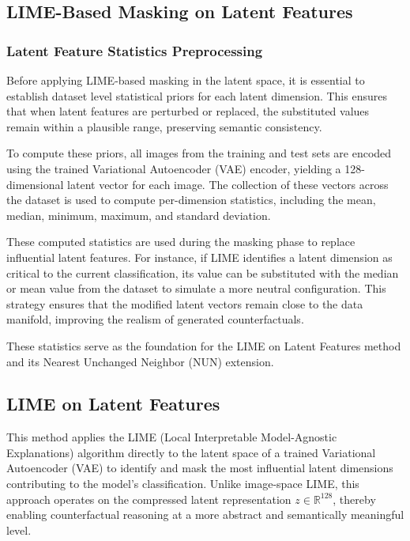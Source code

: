 \vspace{1em}
\subsection{LIME-Based Masking on Latent Features} \label{sec:lime_based_masking_on_latent_features}

\subsubsection*{Latent Feature Statistics Preprocessing}
\label{sec:latent_statistics_preprocessing}
Before applying LIME-based masking in the latent space, it is essential to establish dataset level statistical priors for each latent dimension. This ensures that when latent features are perturbed or replaced, the substituted values remain within a plausible range, preserving semantic consistency.

To compute these priors, all images from the training and test sets are encoded using the trained Variational Autoencoder (VAE) encoder, yielding a 128-dimensional latent vector for each image. The collection of these vectors across the dataset is used to compute per-dimension statistics, including the mean, median, minimum, maximum, and standard deviation.

These computed statistics are used during the masking phase to replace influential latent features. For instance, if LIME identifies a latent dimension as critical to the current classification, its value can be substituted with the median or mean value from the dataset to simulate a more neutral configuration. This strategy ensures that the modified latent vectors remain close to the data manifold, improving the realism of generated counterfactuals.

These statistics serve as the foundation for the LIME on Latent Features method and its Nearest Unchanged Neighbor (NUN) extension.


\subsection{LIME on Latent Features}
\label{sec:lime_on_latent}

This method applies the LIME (Local Interpretable Model-Agnostic Explanations) algorithm directly to the latent space of a trained Variational Autoencoder (VAE) to identify and mask the most influential latent dimensions contributing to the model's classification. Unlike image-space LIME, this approach operates on the compressed latent representation $z \in \mathbb{R}^{128}$, thereby enabling counterfactual reasoning at a more abstract and semantically meaningful level.

